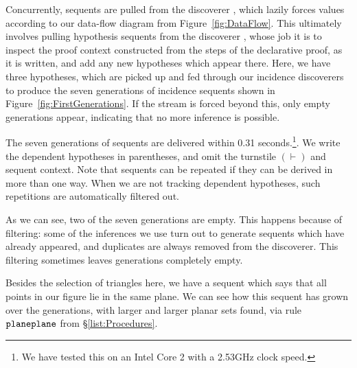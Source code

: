 Concurrently, sequents are pulled from the discoverer , which lazily forces values according to our data-flow diagram from Figure~\ref{fig:DataFlow}. This ultimately involves pulling hypothesis sequents from the discoverer , whose job it is to inspect the proof context constructed from the steps of the declarative proof, as it is written, and add any new hypotheses which appear there. Here, we have three hypotheses, which are picked up and fed through our incidence discoverers to produce the seven generations of incidence sequents shown in Figure~\ref{fig:FirstGenerations}. If the stream is forced beyond this, only empty generations appear, indicating that no more inference is possible.

The seven generations of sequents are delivered within 0.31 seconds.\footnote{We have tested this on an Intel Core 2 with a 2.53GHz clock speed.}. We write the dependent hypotheses in parentheses, and omit the turnstile $(\vdash)$ and sequent context. Note that sequents can be repeated if they can be derived in more than one way. When we are not tracking dependent hypotheses, such repetitions are automatically filtered out.

As we can see, two of the seven generations are empty. This happens because of filtering: some of the inferences we use turn out to generate sequents which have already appeared, and duplicates are always removed from the discoverer. This filtering sometimes leaves generations completely empty. 

Besides the selection of triangles here, we have a sequent which says that all points in our figure lie in the same plane. We can see how this sequent has grown over the generations, with larger and larger planar sets found, via rule~$\texttt{planeplane}$ from \S\ref{list:Procedures}. 

